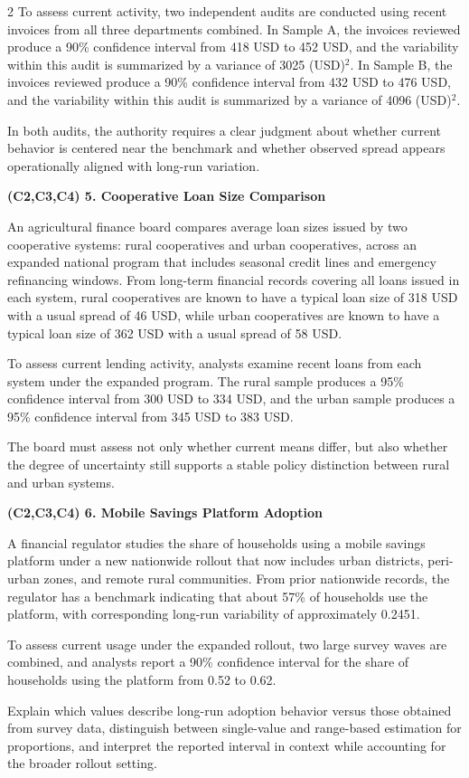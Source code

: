 \documentclass[12pt]{article}
\newcommand{\SubsectionBox}[1]{%
	\noindent\colorbox{gray!30}{%
		\parbox{\linewidth}{\textbf{#1}}%
	}\par\vspace{0.35cm}%
}
\begin{document}
\begin{multicols}{2}
		To assess current activity, two independent audits are conducted using recent invoices from all three departments combined. In Sample A, the invoices reviewed produce a 90\% confidence interval from 418 USD to 452 USD, and the variability within this audit is summarized by a variance of 3025 (USD)$^2$. In Sample B, the invoices reviewed produce a 90\% confidence interval from 432 USD to 476 USD, and the variability within this audit is summarized by a variance of 4096 (USD)$^2$.

		In both audits, the authority requires a clear judgment about whether current behavior is centered near the benchmark and whether observed spread appears operationally aligned with long-run variation.

		\vspace{0.25cm}
		\SubsectionBox{(C2,C3,C4) 5. Cooperative Loan Size Comparison}\vspace{-0.25cm}
		An agricultural finance board compares average loan sizes issued by two cooperative systems: rural cooperatives and urban cooperatives, across an expanded national program that includes seasonal credit lines and emergency refinancing windows. From long-term financial records covering all loans issued in each system, rural cooperatives are known to have a typical loan size of 318 USD with a usual spread of 46 USD, while urban cooperatives are known to have a typical loan size of 362 USD with a usual spread of 58 USD.

		To assess current lending activity, analysts examine recent loans from each system under the expanded program. The rural sample produces a 95\% confidence interval from 300 USD to 334 USD, and the urban sample produces a 95\% confidence interval from 345 USD to 383 USD.

		The board must assess not only whether current means differ, but also whether the degree of uncertainty still supports a stable policy distinction between rural and urban systems.

		\vspace{0.25cm}
		\SubsectionBox{(C2,C3,C4) 6. Mobile Savings Platform Adoption}\vspace{-0.25cm}
		A financial regulator studies the share of households using a mobile savings platform under a new nationwide rollout that now includes urban districts, peri-urban zones, and remote rural communities. From prior nationwide records, the regulator has a benchmark indicating that about 57\% of households use the platform, with corresponding long-run variability of approximately 0.2451.

		To assess current usage under the expanded rollout, two large survey waves are combined, and analysts report a 90\% confidence interval for the share of households using the platform from 0.52 to 0.62.

		Explain which values describe long-run adoption behavior versus those obtained from survey data, distinguish between single-value and range-based estimation for proportions, and interpret the reported interval in context while accounting for the broader rollout setting.

	\end{multicols}
\end{document}
